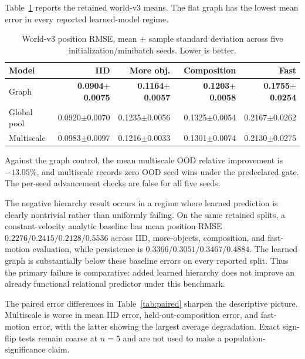 \documentclass[10pt]{article}
\begin{document}
Table~\ref{tab:worldv3} reports the retained world-v3 means. The flat graph has the lowest mean error in every reported learned-model regime.

\begin{table}[t]
\centering
\caption{World-v3 position RMSE, mean $\pm$ sample standard deviation across five initialization/minibatch seeds. Lower is better.}
\label{tab:worldv3}
\begin{tabular}{lrrrr}
\toprule
Model & IID & More obj. & Composition & Fast\\
\midrule
Graph & \textbf{0.0904$\pm$0.0075} & \textbf{0.1164$\pm$0.0057} & \textbf{0.1203$\pm$0.0058} & \textbf{0.1755$\pm$0.0254}\\
Global pool & 0.0920$\pm$0.0070 & 0.1235$\pm$0.0056 & 0.1325$\pm$0.0054 & 0.2167$\pm$0.0262\\
Multiscale & 0.0983$\pm$0.0097 & 0.1216$\pm$0.0033 & 0.1301$\pm$0.0074 & 0.2130$\pm$0.0275\\
\bottomrule
\end{tabular}
\end{table}

Against the graph control, the mean multiscale OOD relative improvement is $-13.05\%$, and multiscale records zero OOD seed wins under the predeclared gate. The per-seed advancement checks are false for all five seeds.

The negative hierarchy result occurs in a regime where learned prediction is clearly nontrivial rather than uniformly failing. On the same retained splits, a constant-velocity analytic baseline has mean position RMSE $0.2276/0.2415/0.2128/0.5536$ across IID, more-objects, composition, and fast-motion evaluation, while persistence is $0.3366/0.3051/0.3467/0.4884$. The learned graph is substantially below these baseline errors on every reported split. Thus the primary failure is comparative: added learned hierarchy does not improve an already functional relational predictor under this benchmark.

The paired error differences in Table~\ref{tab:paired} sharpen the descriptive picture. Multiscale is worse in mean IID error, held-out-composition error, and fast-motion error, with the latter showing the largest average degradation. Exact sign-flip tests remain coarse at $n=5$ and are not used to make a population-significance claim.
\end{document}
